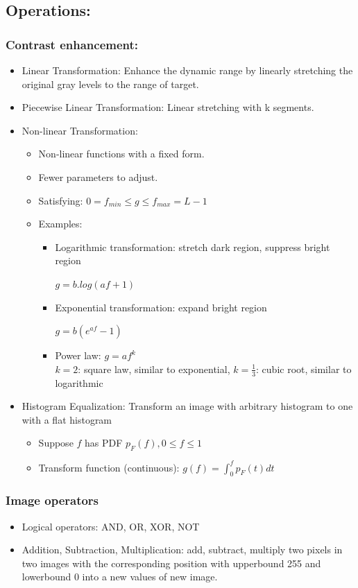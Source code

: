 \subsection{Operations:}
\subsubsection{Contrast enhancement:}
\begin{itemize}
\item Linear Transformation: Enhance the dynamic range by linearly stretching the original gray levels to the range of target.
\item Piecewise Linear Transformation: Linear stretching with k segments.
\item Non-linear Transformation:
\begin{itemize}
\item Non-linear functions with a fixed form.
\item Fewer parameters to adjust.
\item Satisfying: $ 0 = f_{min} \leq g \leq f_{max} = L - 1$
\item Examples:
\begin{itemize}
\item Logarithmic transformation: stretch dark region, suppress bright region
\begin{center}
$ g = b.log(af +1) $
\end{center}
\item Exponential transformation: expand bright region
\begin{center}
$ g = b(e^{af} -1) $
\end{center}
\item Power law: $ g = af^k$\\
$k = 2$: square law, similar to exponential, $k = \frac{1}{3}$: cubic root, similar to logarithmic
\end{itemize}
\end{itemize}
\item Histogram Equalization:
Transform an image with arbitrary histogram to one with a flat histogram
\begin{itemize}
\item Suppose $f$ has PDF $p_F(f), 0 \leq f \leq 1$
\item Transform function (continuous): $g(f) = \int_{0}^{f}p_F(t)dt$
\end{itemize}
\end{itemize}
\subsubsection{Image operators}
\begin{itemize}
\item Logical operators: AND, OR, XOR, NOT 
\item Addition, Subtraction, Multiplication: add, subtract, multiply two pixels in two images with the corresponding position with upperbound 255 and lowerbound 0 into a new values of new image.
\end{itemize}
